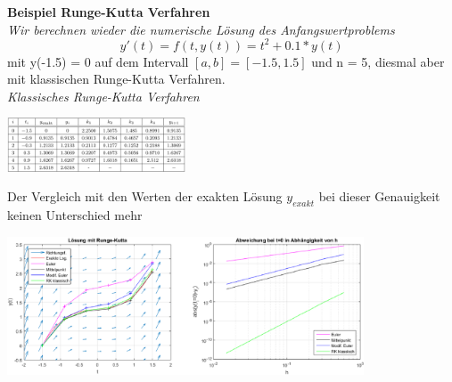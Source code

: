 \documentclass{article}
\newenvironment{Figure}
	{\par\medskip\noindent\minipage{\linewidth}}
	{\endminipage\par\medskip}
\theoremstyle{satz}
\theoremstyle{definition}
\begin{document}
\textbf{Beispiel Runge-Kutta Verfahren}\\
\textit{Wir berechnen wieder die numerische Lösung des Anfangswertproblems}
\begin{equation}
y'(t) = f(t,y(t)) = t^2 + 0.1 * y(t)
\end{equation}
mit y(-1.5) = 0 auf dem Intervall $[a,b] = [-1.5, 1.5]$ und n = 5, diesmal aber mit klassischen Runge-Kutta Verfahren.\\
\textit{Klassisches Runge-Kutta Verfahren}
\begin{Figure}
\centering
\includegraphics[width=200px]{img/RungeKuttaVerfahren.png}
	\label{fig:Klassisches Runge-Kutta-Verfahren}
\end{Figure}
Der Vergleich mit den Werten der exakten Lösung $y_{exakt}$ bei dieser Genauigkeit keinen Unterschied mehr\\
\begin{Figure}
\centering
\includegraphics[width=400px]{img/verschiedeneVerfahrenInklRungeKutta.png}
	\label{fig:Klassisches Runge-Kutta-Verfahren}
\end{Figure}
\end{document}

